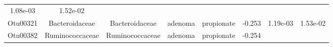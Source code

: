 \documentclass[11pt,]{article}
\begin{document}
\begin{longtable}[]{@{}cccccccc@{}}
\begin{minipage}[t]{0.08\columnwidth}
1.08e-03\strut
\end{minipage} & \begin{minipage}[t]{0.08\columnwidth}\centering\strut
1.52e-02\strut
\end{minipage}\tabularnewline
\begin{minipage}[t]{0.08\columnwidth}\centering\strut
Otu00321\strut
\end{minipage} & \begin{minipage}[t]{0.15\columnwidth}\centering\strut
Bacteroidaceae\strut
\end{minipage} & \begin{minipage}[t]{0.15\columnwidth}\centering\strut
Bacteroidaceae\strut
\end{minipage} & \begin{minipage}[t]{0.08\columnwidth}\centering\strut
adenoma\strut
\end{minipage} & \begin{minipage}[t]{0.09\columnwidth}\centering\strut
propionate\strut
\end{minipage} & \begin{minipage}[t]{0.07\columnwidth}\centering\strut
-0.253\strut
\end{minipage} & \begin{minipage}[t]{0.08\columnwidth}\centering\strut
1.19e-03\strut
\end{minipage} & \begin{minipage}[t]{0.08\columnwidth}\centering\strut
1.53e-02\strut
\end{minipage}\tabularnewline
\begin{minipage}[t]{0.08\columnwidth}\centering\strut
Otu00382\strut
\end{minipage} & \begin{minipage}[t]{0.15\columnwidth}\centering\strut
Ruminococcaceae\strut
\end{minipage} & \begin{minipage}[t]{0.15\columnwidth}\centering\strut
Ruminococcaceae\strut
\end{minipage} & \begin{minipage}[t]{0.08\columnwidth}\centering\strut
adenoma\strut
\end{minipage} & \begin{minipage}[t]{0.09\columnwidth}\centering\strut
propionate\strut
\end{minipage} & \begin{minipage}[t]{0.07\columnwidth}\centering\strut
-0.254\strut
\end{minipage} & \begin{minipage}[t]{0.08\columnwidth}\centering\strut

\end{minipage}
\end{longtable}
\end{document}
